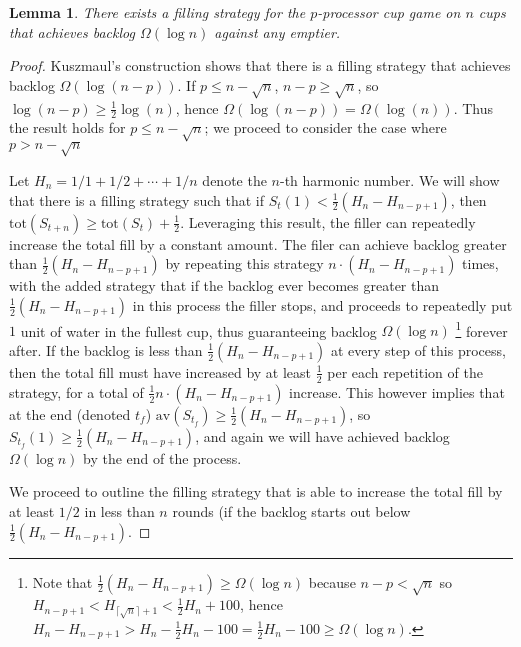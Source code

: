 \documentclass{article}[11pt]
\newtheorem{lemma}{Lemma}
\begin{document}
\begin{lemma}
  There exists a filling strategy for the $p$-processor cup game on $n$ cups
  that achieves backlog $\Omega(\log n)$ against any emptier.
\end{lemma}
\begin{proof}
Kuszmaul's construction shows that there is a filling strategy that achieves
backlog $\Omega(\log (n-p))$.  If $p \le n - \sqrt{n}$, $n-p \ge \sqrt{n}$, so $\log
(n-p) \ge \frac{1}{2}\log (n)$, hence $\Omega(\log(n-p)) = \Omega(\log(n))$.
Thus the result holds for $p \le n - \sqrt{n}$; we proceed to consider the case
where $p > n-\sqrt{n}$

Let $H_n = 1/1+1/2+\cdots +1/n$ denote the $n$-th harmonic number.  We will
show that there is a filling strategy such that if $S_t(1) < \frac{1}{2} (H_n -
H_{n-p+1})$, then $\text{tot}(S_{t+n}) \ge \text{tot}(S_t) + \frac{1}{2}$.
Leveraging this result, the filler can repeatedly increase the total fill by a
constant amount. The filer can achieve backlog greater than $\frac{1}{2}(H_n -
H_{n-p+1})$ by repeating this strategy $n\cdot (H_n-H_{n-p+1})$ times, with the
added strategy that if the backlog ever becomes greater than
$\frac{1}{2}(H_n-H_{n-p+1})$ in this process the filler stops, and proceeds
to repeatedly put $1$ unit of water in the fullest cup, thus guaranteeing
backlog $\Omega(\log n)$ \footnote{ Note that $\frac{1}{2} (H_n - H_{n-p+1}) \ge
\Omega(\log n)$ because $n - p < \sqrt{n}$ so $H_{n-p+1} <
H_{\lceil\sqrt{n}\rceil + 1} < \frac{1}{2} H_n + 100$, hence $H_n - H_{n-p+1} > H_n -
\frac{1}{2}H_n- 100 = \frac{1}{2} H_n - 100 \ge \Omega(\log n)$.  } forever
after. If the backlog is less than $\frac{1}{2} (H_n-H_{n-p+1})$ at every step of
this process, then the total fill must have increased by at least $\frac{1}{2}
$ per each repetition of the strategy, for a total of $\frac{1}{2}n \cdot
(H_{n} - H_{n-p+1})$ increase. This however implies that at the end (denoted
$t_f$) $\text{av}(S_{t_f}) \ge \frac{1}{2} (H_n-H_{n-p+1})$, so $S_{t_f}(1) \ge
\frac{1}{2} (H_n - H_{n-p+1})$, and again we will have achieved backlog
$\Omega(\log n)$ by the end of the process. 

We proceed to outline the filling strategy that is able to increase the total
fill by at least $1/2$ in less than $n$ rounds (if the backlog starts out below
$\frac{1}{2}(H_n - H_{n-p+1})$.


\end{proof}
\end{document}
